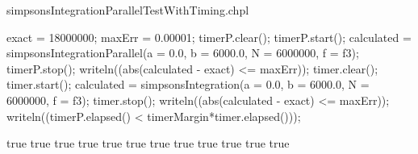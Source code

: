 \begin{chapelexample}{simpsonsIntegrationParallelTestWithTiming.chpl}
\begin{chapel}
    exact = 18000000;
    maxErr = 0.00001;
    timerP.clear();
    timerP.start();
    calculated = simpsonsIntegrationParallel(a = 0.0, b = 6000.0, N = 6000000, f = f3);
    timerP.stop();
    writeln((abs(calculated - exact) <= maxErr));
    timer.clear();
    timer.start();
    calculated = simpsonsIntegration(a = 0.0, b = 6000.0, N = 6000000, f = f3);
    timer.stop();
    writeln((abs(calculated - exact) <= maxErr));
    writeln((timerP.elapsed() < timerMargin*timer.elapsed()));
  \end{chapel}
  \begin{chapelpost}
  \end{chapelpost}
  \begin{chapeloutput}
true
true
true
true
true
true
true
true
true
true
true
true
  \end{chapeloutput}
\end{chapelexample}
